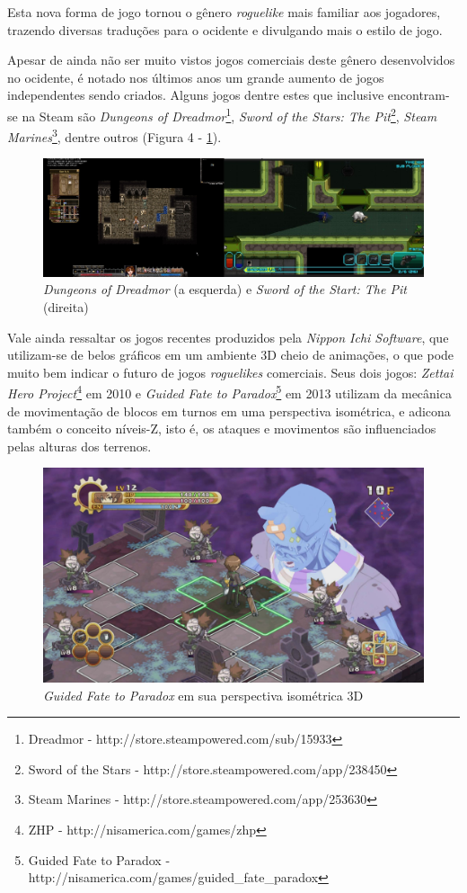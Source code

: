Esta nova forma de jogo tornou o gênero \textit{roguelike} mais familiar aos jogadores, trazendo diversas traduções para o ocidente e divulgando mais o estilo de jogo.


Apesar de ainda não ser muito vistos jogos comerciais deste gênero desenvolvidos no ocidente, é notado nos últimos anos um grande aumento de jogos independentes sendo criados. Alguns jogos dentre estes que inclusive encontram-se na Steam são \textit{Dungeons of Dreadmor}\footnote{Dreadmor - http://store.steampowered.com/sub/15933}, \textit{Sword of the Stars: The Pit}\footnote{Sword of the Stars - http://store.steampowered.com/app/238450}, \textit{Steam Marines}\footnote{Steam Marines - http://store.steampowered.com/app/253630}, dentre outros (Figura 4 - \ref{fig04}). 
\begin{figure}[h]
	\centering
	\label{fig04}
		\includegraphics[keepaspectratio=true,scale=0.5]{figuras/fig04-dun_pit.png}
	\caption{\textit{Dungeons of Dreadmor} (a esquerda) e \textit{Sword of the Start: The Pit} (direita) }
\end{figure}


Vale ainda ressaltar os jogos recentes produzidos pela \textit{Nippon Ichi Software}, que utilizam-se de belos gráficos em um ambiente 3D cheio de animações, o que pode muito bem indicar o futuro de jogos \textit{roguelikes} comerciais. Seus dois jogos: \textit{Zettai Hero Project}\footnote{ZHP - http://nisamerica.com/games/zhp } em 2010 e \textit{Guided Fate to Paradox}\footnote{Guided Fate to Paradox - http://nisamerica.com/games/guided\_fate\_paradox } em 2013 utilizam da mecânica de movimentação de blocos em turnos em uma perspectiva isométrica, e adicona também o conceito níveis-Z, isto é, os ataques e movimentos são influenciados pelas alturas dos terrenos.


\begin{figure}[h]
	\centering
	\label{fig05}
		\includegraphics[keepaspectratio=true,scale=0.2]{figuras/fig05_guidedfate.jpg}
	\caption{\textit{Guided Fate to Paradox} em sua perspectiva isométrica 3D }
\end{figure}



